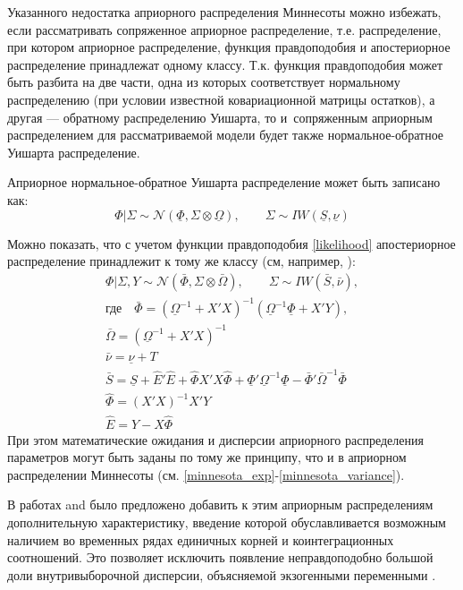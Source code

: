 \documentclass[11pt]{article} %
\newcommand{\cN}{\mathcal{N}}
\begin{document}
Указанного недостатка априорного распределения Миннесоты можно избежать, если рассматривать сопряженное априорное распределение, т.е. распределение, при котором  априорное распределение, функция правдоподобия и апостериорное распределение принадлежат одному классу. Т.к. функция правдоподобия может быть разбита на две части, одна из которых соответствует нормальному распределению (при условии известной ковариационной матрицы остатков), а другая --- обратному распределению Уишарта, то и~сопряженным априорным распределением для рассматриваемой модели будет также нормальное-обратное Уишарта распределение.


Априорное нормальное-обратное Уишарта распределение может быть записано как:
\begin{equation}
\Phi|\Sigma\sim \cN (\underline \Phi, \Sigma\otimes\underline \Omega), \qquad \Sigma\sim IW(\underline S, \underline \nu)
\end{equation}

Можно показать, что с учетом функции правдоподобия \eqref{likelihood} апостериорное распределение принадлежит к тому же классу (см, например, \cite{zellner_1996_introduction}):
\begin{gather}
\Phi|\Sigma,Y\sim \cN (\bar \Phi, \Sigma\otimes\bar \Omega), \qquad \Sigma\sim IW(\bar S, \bar \nu),\\
\mbox{где}\quad \bar \Phi=(\underline \Omega^{-1}+X'X)^{-1}(\underline \Omega^{-1}\underline \Phi+X'Y),\\
\bar{\Omega}=(\underline \Omega^{-1}+X'X)^{-1}\\
\bar\nu =\underline \nu+T\\
\bar S=\underline S +\hat E'\hat E+\hat \Phi X'X \hat \Phi +\underline \Phi'\underline\Omega^{-1}\underline \Phi-\bar \Phi'\bar\Omega^{-1}\bar \Phi\\
\hat\Phi=(X'X)^{-1}X'Y\\%
\hat E=Y-X\hat\Phi
\end{gather}
При этом математические ожидания и дисперсии априорного распределения параметров могут быть заданы по тому же принципу, что и в априорном распределении Миннесоты (см. \eqref{minnesota_exp}-\eqref{minnesota_variance}).

В работах \cite{doan_litterman_sims_1984_forecasting} and \cite{sims_1993_nine} было предложено добавить к этим априорным распределениям дополнительную характеристику, введение которой обуславливается возможным наличием во временных рядах единичных корней и коинтеграционных  соотношений. Это позволяет исключить появление неправдоподобно большой доли внутривыборочной дисперсии, объясняемой экзогенными переменными \cite{carriero_al_2015_bayesian}. %
\end{document}
